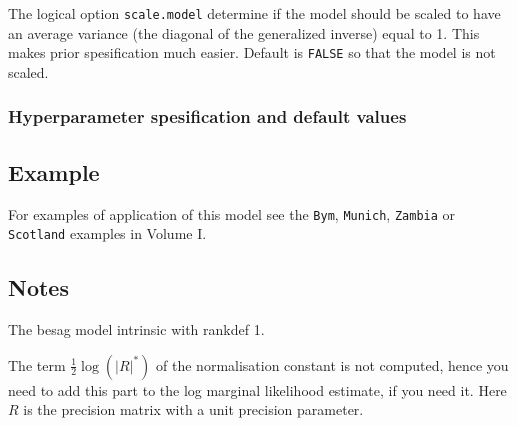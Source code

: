 \documentclass[a4paper,11pt]{article}
\begin{document}
The logical option \verb|scale.model| determine if the model should be
scaled to have an average variance (the diagonal of the generalized
inverse) equal to 1. This makes prior spesification much
easier. Default is \verb|FALSE| so that the model is not scaled.


\subsubsection*{Hyperparameter spesification and default values}


\subsection*{Example}

For examples of application of this model see the {\tt Bym}, {\tt Munich}, {\tt Zambia} or {\tt Scotland} examples in Volume I.

\subsection*{Notes}

The besag model intrinsic with rankdef 1.

The term $\frac{1}{2}\log(|R|^{*})$ of the normalisation constant is
not computed, hence you need to add this part to the log marginal
likelihood estimate, if you need it. Here $R$ is the precision matrix
with a unit precision parameter.
\end{document}
